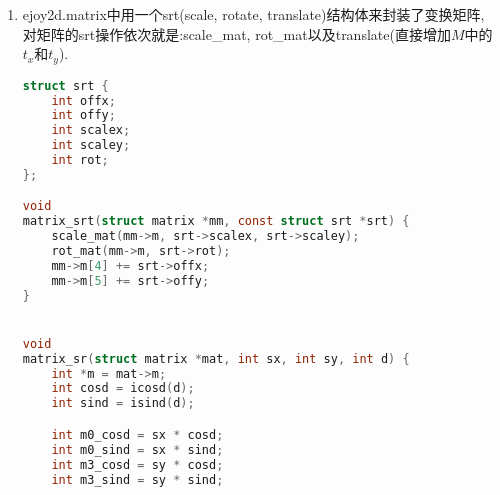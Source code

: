 {\begin {enumerate}
{        代码中对角度的计算做了一个$cos$表, $cos$和$sin$的计算都是通过查表来得到的, 代码中做$sin$计算时的64, 是$sin\theta = cos(90 - \theta)$经过1024换算后得到的.
        \begin{lstlisting}[language={[ANSI]C}]
static inline int
icost(int dd) {
    static int t[256] = {
    ...
    };
    if (dd < 0) {
        dd = 256 - (-dd % 256);
    } else {
        dd %= 256;
    }

    return t[dd];
}

static inline int
icosd(int d) {
    int dd = d/4;
    return icost(dd);
}

static inline int
isind(int d) {
    int dd = 64 - d/4;
    return icost(dd);
}
        \end{lstlisting}
    }

    \gaccobsplitinv

    \item{ {}\par
        ejoy2d.matrix中用一个srt(scale, rotate, translate)结构体来封装了变换矩阵, 对矩阵的srt操作依次就是:scale\_mat, rot\_mat以及translate(直接增加$M$中的$t_x$和$t_y$).
        \begin{lstlisting}[language=C]
struct srt {
	int offx;
	int offy;
	int scalex;
	int scaley;
	int rot;
};

void
matrix_srt(struct matrix *mm, const struct srt *srt) {
	scale_mat(mm->m, srt->scalex, srt->scaley);
	rot_mat(mm->m, srt->rot);
	mm->m[4] += srt->offx;
	mm->m[5] += srt->offy;
}


void
matrix_sr(struct matrix *mat, int sx, int sy, int d) {
	int *m = mat->m;
	int cosd = icosd(d);
	int sind = isind(d);

	int m0_cosd = sx * cosd;
	int m0_sind = sx * sind;
	int m3_cosd = sy * cosd;
	int m3_sind = sy * sind;


\end{lstlisting}}
\end{enumerate}}
